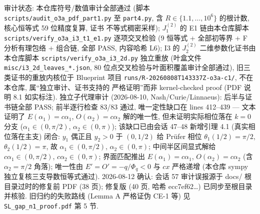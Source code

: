 \documentclass[UTF8]{ctexart}
\begin{document}
\begin{sloppypar}
审计状态: 本仓库符号/数值审计全部通过 (脚本 \texttt{scripts/audit\_o3a\_pdf\_part1.py} 至
\texttt{part4.py}, 含 $R\in\{1.1,\dots,10^6\}$ 的根计数, 核心恒等式 59 位精度复算, 证书
不等式稠密采样); $J_1^{(2)}$ 的 E1 链由本仓库脚本
\texttt{scripts/verify\_\allowbreak o3a\_\allowbreak i3\_\allowbreak t1\_\allowbreak e1.py} 逐项交叉检验 (9 恒等式 + 全部初等界 + F 分析有理包络 + 组合链,
全部 PASS, 内容哈希 L6); I3 的 $J_2^{(2)}$ 二维参数化证书由本仓库脚本
\texttt{scripts/verify\_\allowbreak o3a\_\allowbreak i3\_\allowbreak 2d.py} 独立重放 (叶盒文件 \texttt{misc/i3\_\allowbreak 2d\_\allowbreak leaves\_*.json},
80 位点交叉检验与叶面积覆盖审计全部通过), 旧三类证书的重放内核位于 Blueprint 项目
\texttt{runs/R-\allowbreak 20260808T143337Z-\allowbreak o3a-c1/}, 不在本仓库, 属``独立审计、证书支持的
严格证明''而非 kernel-checked proof (PDF 说明 8.1 如实标注). 独立子代理审计 (2026-08-10, Nash/Curie/Linnaeus): 后半与证书链全部 PASS; 前半逐行检查 83/83 通过, 唯一定性缺口在 lines 412--439 --- 文本证明了 $E(\alpha_1)=c\alpha_1$, $O(\alpha_2)=c\alpha_2$ 解的唯一性, 但未证明实际相位落在 $k=0$ 分支 ($\alpha_1\in(0,\pi/2)$, $\alpha_2\in(0,\pi)$); 该缺口已由会话 47--48 新增引理 4.1 (真实相位落在主支) 闭合: $y_1$ 偶正且 $y_2>0$ 于 $(0,1/2)$ 给 Prüfer 相位 $\theta_1(1/2)=\pi/2$, $\theta_2(1/2)=\pi$, 故 $\alpha_1\in(0,\pi/2)$, $\alpha_2\in(0,\pi)$; 中间半区间显式解给 $c\alpha_1\in(0,\pi/2)$, $c\alpha_2\in(0,\pi)$; 界面匹配推出 $E(\alpha_1)=c\alpha_1$, $O(\alpha_2)=c\alpha_2$ (含 $\alpha_2=\pi/2$ 角落); 唯一性由 $E'=O'=-q/\Phi_q<0$ 与 $cx$ 严格递增 (本仓库 sympy 独立复核三支导数恒等式通过). 2026-08-12 确认: 会话 57 审计误报源于 docs/ 根目录过时的修复前 PDF (38 页); 修复版 (40 页, 哈希 ecc7ef62\ldots) 已同步至根目录并核验. 旧归约的失败路线
(Lemma A 严格证伪 CE-1 等) 见 \texttt{SL\_gap\_n1\_proof.pdf} 第 5 节.
\end{sloppypar}
\end{document}
